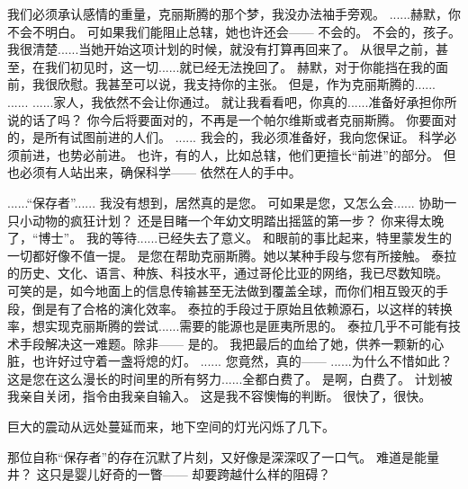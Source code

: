 \documentclass[openany]{book}
\begin{document}
\begin{dialogue}
     我们必须承认感情的重量，克丽斯腾的那个梦，我没办法袖手旁观。
     ......赫默，你不会不明白。
     可如果我们能阻止总辖，她也许还会——
     不会的。
     不会的，孩子。
     我很清楚......当她开始这项计划的时候，就没有打算再回来了。
     从很早之前，甚至，在我们初见时，这一切......就已经无法挽回了。
     赫默，对于你能挡在我的面前，我很欣慰。我甚至可以说，我支持你的主张。
     但是，作为克丽斯腾的......
     ......
     ......家人，我依然不会让你通过。
     就让我看看吧，你真的......准备好承担你所说的话了吗？
     你今后将要面对的，不再是一个帕尔维斯或者克丽斯腾。
     你要面对的，是所有试图前进的人们。
     ......
     我会的，我必须准备好，我向您保证。
     科学必须前进，也势必前进。
     也许，有的人，比如总辖，他们更擅长“前进”的部分。
     但也必须有人站出来，确保科学——
     依然在人的手中。
\end{dialogue}

\begin{dialogue}
     ......“保存者”......
     我没有想到，居然真的是您。
     可如果是您，又怎么会......
     协助一只小动物的疯狂计划？
     还是目睹一个年幼文明踏出摇篮的第一步？
     你来得太晚了，“博士”。
     我的等待......已经失去了意义。
     和眼前的事比起来，特里蒙发生的一切都好像不值一提。
     是您在帮助克丽斯腾。她以某种手段与您有所接触。
     泰拉的历史、文化、语言、种族、科技水平，通过哥伦比亚的网络，我已尽数知晓。
     可笑的是，如今地面上的信息传输甚至无法做到覆盖全球，而你们相互毁灭的手段，倒是有了合格的演化效率。
     泰拉的手段过于原始且依赖源石，以这样的转换率，想实现克丽斯腾的尝试......需要的能源也是匪夷所思的。
     泰拉几乎不可能有技术手段解决这一难题。除非——
     是的。
     我把最后的血给了她，供养一颗新的心脏，也许好过守着一盏将熄的灯。
     ......
     您竟然，真的——
     ......为什么不惜如此？这是您在这么漫长的时间里的所有努力......全都白费了。
     是啊，白费了。
     计划被我亲自关闭，指令由我亲自输入。
     这是我不容懊悔的判断。
     很快了，很快。\par
    巨大的震动从远处蔓延而来，地下空间的灯光闪烁了几下。\par
    那位自称“保存者”的存在沉默了片刻，又好像是深深叹了一口气。
     难道是能量井？
     这只是婴儿好奇的一瞥——
     却要跨越什么样的阻碍？
\end{dialogue}
\end{document}
